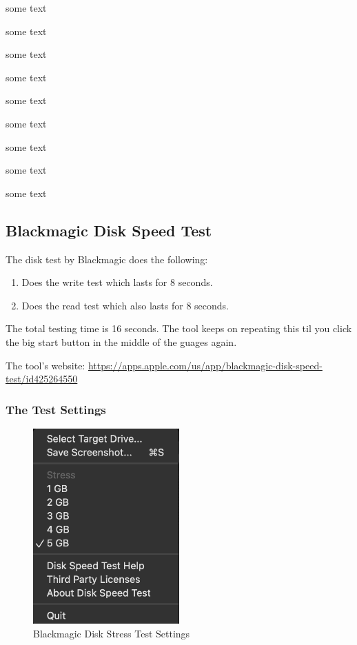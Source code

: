 \documentclass[a4paper]{article}
\begin{document}
some text

some text

some text

some text

some text

some text

some text

some text

some text


\subsection{Blackmagic Disk Speed Test}

The disk test by Blackmagic does the following:

\begin{enumerate}
    \item Does the write test which lasts for 8 seconds.
    \item Does the read test which also lasts for 8 seconds.
\end{enumerate}

The total testing time is 16 seconds. The tool keeps on repeating this til you click the big start button in the middle of the guages again.

The tool's website: \url{https://apps.apple.com/us/app/blackmagic-disk-speed-test/id425264550}

\subsubsection{The Test Settings}

\begin{figure}[h!]
    \centering
    \includegraphics[width=0.5\textwidth]{images/blackmagic-disk-stress-settings.png}
    \caption{Blackmagic Disk Stress Test Settings}
    \label{fig:blackmagic-disk-stress-test-settings}
\end{figure}
\end{document}
